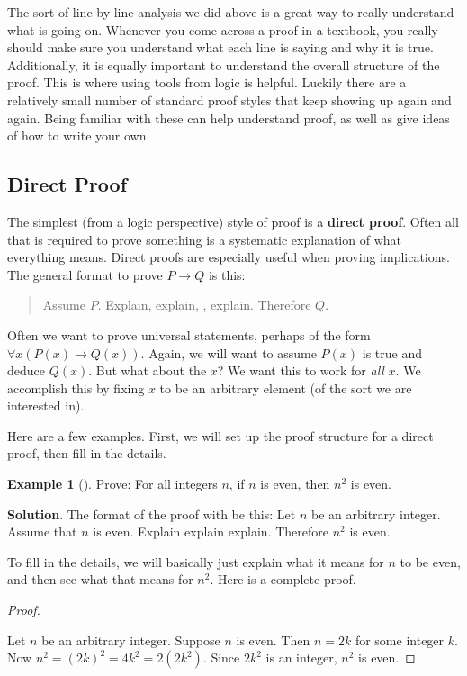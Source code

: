 \documentclass[10pt,]{book}
\newcommand{\terminology}[1]{\textbf{#1}}
\theoremstyle{plain}
\theoremstyle{definition}
\theoremstyle{definition}
\newtheorem{example}[theorem]{Example}
\theoremstyle{definition}
\theoremstyle{definition}
\numberwithin{equation}{chapter}
\def\imp{\rightarrow}
\begin{document}
\par
\hypertarget{p-2039}{}%
The sort of line-by-line analysis we did above is a great way to really understand what is going on. Whenever you come across a proof in a textbook, you really should make sure you understand what each line is saying and why it is true. Additionally, it is equally important to understand the overall structure of the proof. This is where using tools from logic is helpful. Luckily there are a relatively small number of standard proof styles that keep showing up again and again. Being familiar with these can help understand proof, as well as give ideas of how to write your own.%
\typeout{************************************************}
\typeout{************************************************}
\subsection[{Direct Proof}]{Direct Proof}\label{subsection-42}
\hypertarget{p-2040}{}%
%
\par
\hypertarget{p-2041}{}%
The simplest (from a logic perspective) style of proof is a \terminology{direct proof}. Often all that is required to prove something is a systematic explanation of what everything means. Direct proofs are especially useful when proving implications. The general format to prove \(P \imp Q\) is this:%
\begin{quote}\hypertarget{blockquote-14}{}
\hypertarget{p-2042}{}%
Assume \(P\). Explain, explain, \textellipsis{}, explain. Therefore \(Q\).%
\end{quote}
\hypertarget{p-2043}{}%
Often we want to prove universal statements, perhaps of the form \(\forall x (P(x) \imp Q(x))\). Again, we will want to assume \(P(x)\) is true and deduce \(Q(x)\). But what about the \(x\)? We want this to work for \emph{all} \(x\). We accomplish this by fixing \(x\) to be an arbitrary element (of the sort we are interested in).%
\par
\hypertarget{p-2044}{}%
Here are a few examples. First, we will set up the proof structure for a direct proof, then fill in the details.%
\begin{example}[]\label{example-64}
\hypertarget{p-2045}{}%
Prove: For all integers \(n\), if \(n\) is even, then \(n^2\) is even.%
\par\smallskip%
\noindent\textbf{Solution}.\hypertarget{solution-181}{}\quad%
\hypertarget{p-2046}{}%
The format of the proof with be this: Let \(n\) be an arbitrary integer. Assume that \(n\) is even. Explain explain explain. Therefore \(n^2\) is even.%
\par
\hypertarget{p-2047}{}%
To fill in the details, we will basically just explain what it means for \(n\) to be even, and then see what that means for \(n^2\). Here is a complete proof.%
\begin{proof}\hypertarget{proof-21}{}
\hypertarget{p-2048}{}%
Let \(n\) be an arbitrary integer. Suppose \(n\) is even. Then \(n = 2k\) for some integer \(k\). Now \(n^2 = (2k)^2 = 4k^2 = 2(2k^2)\). Since \(2k^2\) is an integer, \(n^2\) is even.%
\end{proof}
\end{example}
\end{document}
